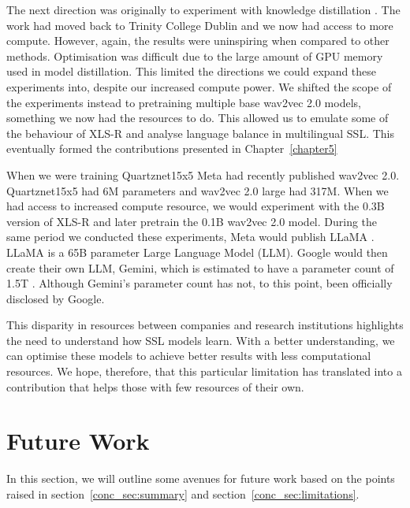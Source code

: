 The next direction was originally to experiment with knowledge distillation \cite{distillation}. The work had moved back to Trinity College Dublin and we now had access to more compute. However, again, the results were uninspiring when compared to other methods. Optimisation was difficult due to the large amount of GPU memory used in model distillation. This limited the directions we could expand these experiments into, despite our increased compute power. We shifted the scope of the experiments instead to pretraining multiple base wav2vec 2.0 models, something we now had the resources to do. This allowed us to emulate some of the behaviour of XLS-R and analyse language balance in multilingual SSL. This eventually formed the contributions presented in Chapter~\ref{chapter5}

When we were training Quartznet15x5 \cite{quartznet} Meta had recently published wav2vec 2.0. Quartznet15x5 had 6M parameters and wav2vec 2.0 large had 317M. When we had access to increased compute resource, we would experiment with the 0.3B version of XLS-R and later pretrain the 0.1B wav2vec 2.0 model. During the same period we conducted these experiments, Meta would publish LLaMA \cite{llama_citation}. LLaMA is a 65B parameter Large Language Model (LLM). Google would then create their own LLM, Gemini, which is estimated to have a parameter count of 1.5T \cite{howtoreference?}. Although Gemini's parameter count has not, to this point, been officially disclosed by Google. 

This disparity in resources between companies and research institutions highlights the need to understand how SSL models learn. With a better understanding, we can optimise these models to achieve better results with less computational resources. We hope, therefore, that this particular limitation has translated into a contribution that helps those with few resources of their own.


\section{Future Work}\label{conc_sec:future_work}

In this section, we will outline some avenues for future work based on the points raised in section~\ref{conc_sec:summary} and section~\ref{conc_sec:limitations}.

